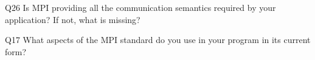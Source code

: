 \begin{description}%
\item{Q26} Is MPI providing all the communication semantics required by your application? If not, what is missing?%
\item{Q17} What aspects of the MPI standard do you use in your program in its current form?%
\end{description}%
